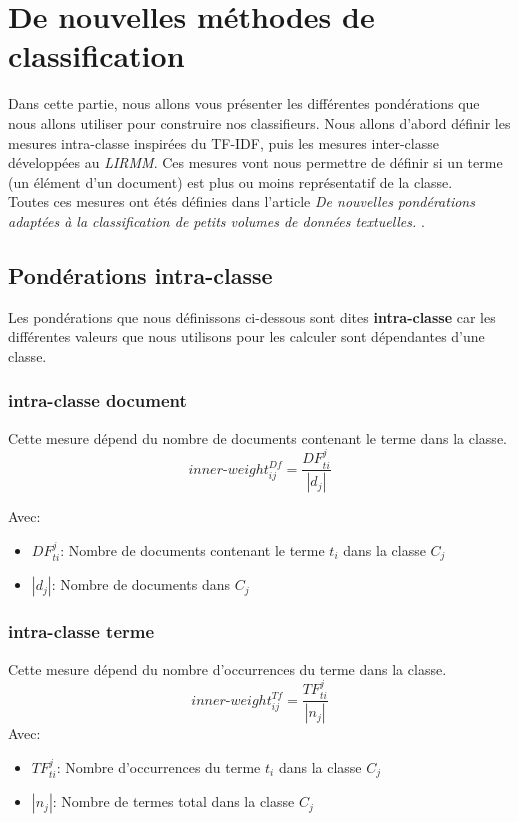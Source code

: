 \documentclass{article}
\begin{document}
\section{De nouvelles méthodes de classification}
Dans cette partie, nous allons vous présenter les différentes pondérations que nous allons utiliser pour construire nos classifieurs.
Nous allons d'abord définir les mesures intra-classe inspirées du TF-IDF, puis les mesures inter-classe développées au \textit{LIRMM}.
Ces mesures vont nous permettre de définir si un terme (un élément d'un document) est plus ou moins représentatif de la classe.\\Toutes ces mesures ont étés définies dans l'article \textit{De nouvelles pondérations adaptées à la classification de petits volumes de données textuelles. }\cite{RNTIB}.
\subsection{Pondérations intra-classe}
Les pondérations que nous définissons ci-dessous sont dites \textbf{intra-classe} car les différentes valeurs que nous utilisons pour les
calculer sont dépendantes d'une classe.
\subsubsection*{intra-classe document}
Cette mesure dépend du nombre de documents contenant le terme dans la classe.
  \[ inner\mbox{-}weight_{ij}^{Df} = \frac{DF_{ti}^j}{|d_{j}|}\]
  
      Avec:
  \begin{itemize}
  	\item $DF_{ti}^j$: Nombre de documents contenant le terme $t_i$ dans la classe $C_j$	
  	\item $|d_{j}|$: Nombre de documents dans $C_j$	
    \end{itemize}
\subsubsection*{intra-classe terme}
Cette mesure dépend du nombre d'occurrences du terme dans la classe.
\[   inner\mbox{-}weight_{ij}^{Tf} = \frac{TF_{ti}^j}{|n_{j}|}\]
  Avec:
\begin{itemize}
	\item $TF_{ti}^j$: Nombre d'occurrences du terme $t_i$ dans la classe $C_j$	
	\item $|n_{j}|$: Nombre de termes total dans la classe $C_j$	
  \end{itemize}
\end{document}
